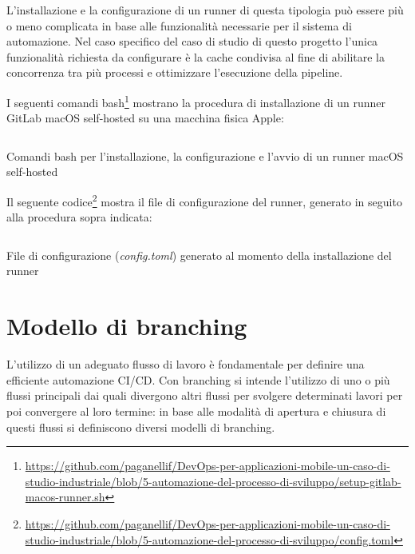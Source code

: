 L'installazione e la configurazione di un runner di questa tipologia può essere più o meno complicata in base alle funzionalità necessarie per il sistema di automazione. Nel caso specifico del caso di studio di questo progetto l'unica funzionalità richiesta da configurare è la cache condivisa al fine di abilitare la concorrenza tra più processi e ottimizzare l'esecuzione della pipeline.

I seguenti comandi bash\footnote{\href{https://github.com/paganellif/DevOps-per-applicazioni-mobile-un-caso-di-studio-industriale/blob/5-automazione-del-processo-di-sviluppo/setup-gitlab-macos-runner.sh}{https://github.com/paganellif/DevOps-per-applicazioni-mobile-un-caso-di-studio-industriale/blob/5-automazione-del-processo-di-sviluppo/setup-gitlab-macos-runner.sh}} mostrano la procedura di installazione di un runner GitLab macOS self-hosted su una macchina fisica Apple:
\begin{listing}[H]
    \inputminted{bash}{code/macos-runner-setup.sh}
    \caption{Comandi bash per l'installazione, la configurazione e l'avvio di un runner macOS self-hosted}
\end{listing}

Il seguente codice\footnote{\href{https://github.com/paganellif/DevOps-per-applicazioni-mobile-un-caso-di-studio-industriale/blob/5-automazione-del-processo-di-sviluppo/config.toml}{https://github.com/paganellif/DevOps-per-applicazioni-mobile-un-caso-di-studio-industriale/blob/5-automazione-del-processo-di-sviluppo/config.toml}} mostra il file di configurazione del runner, generato in seguito alla procedura sopra indicata:

\begin{listing}[H]
    \inputminted{toml}{code/macos-runner-config.toml}
    \caption{File di configurazione (\textit{config.toml}) generato al momento della installazione del runner}
\end{listing}

\section{Modello di branching}
L’utilizzo di un adeguato flusso di lavoro è fondamentale per definire una efficiente automazione CI/CD. Con branching si intende l’utilizzo di uno o più flussi principali dai quali divergono altri flussi per svolgere determinati lavori per poi convergere al loro termine: in base alle modalità di apertura e chiusura di questi flussi si definiscono diversi modelli di branching.

